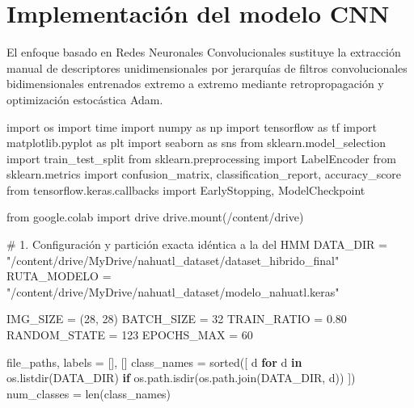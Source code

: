\documentclass[
  spanish,
  us-letterpaper,
]{scrreprt}
\newenvironment{Shaded}{\begin{snugshade}}{\end{snugshade}}
\newcommand{\BuiltInTok}[1]{\textcolor[rgb]{0.00,0.23,0.31}{#1}}
\newcommand{\CommentTok}[1]{\textcolor[rgb]{0.37,0.37,0.37}{#1}}
\newcommand{\ControlFlowTok}[1]{\textcolor[rgb]{0.00,0.23,0.31}{\textbf{#1}}}
\newcommand{\DecValTok}[1]{\textcolor[rgb]{0.68,0.00,0.00}{#1}}
\newcommand{\FloatTok}[1]{\textcolor[rgb]{0.68,0.00,0.00}{#1}}
\newcommand{\ImportTok}[1]{\textcolor[rgb]{0.00,0.46,0.62}{#1}}
\newcommand{\KeywordTok}[1]{\textcolor[rgb]{0.00,0.23,0.31}{\textbf{#1}}}
\newcommand{\NormalTok}[1]{\textcolor[rgb]{0.00,0.23,0.31}{#1}}
\newcommand{\OperatorTok}[1]{\textcolor[rgb]{0.37,0.37,0.37}{#1}}
\newcommand{\StringTok}[1]{\textcolor[rgb]{0.13,0.47,0.30}{#1}}
\theoremstyle{definition}
\theoremstyle{remark}
\begin{document}
\section{Implementación del modelo
CNN}\label{implementaciuxf3n-del-modelo-cnn}

El enfoque basado en Redes Neuronales Convolucionales sustituye la
extracción manual de descriptores unidimensionales por jerarquías de
filtros convolucionales bidimensionales entrenados extremo a extremo
mediante retropropagación y optimización estocástica Adam.

\label{cnn-datos-aumentacion}
\begin{Shaded}
\begin{Highlighting}[]
\ImportTok{import}\NormalTok{ os}
\ImportTok{import}\NormalTok{ time}
\ImportTok{import}\NormalTok{ numpy }\ImportTok{as}\NormalTok{ np}
\ImportTok{import}\NormalTok{ tensorflow }\ImportTok{as}\NormalTok{ tf}
\ImportTok{import}\NormalTok{ matplotlib.pyplot }\ImportTok{as}\NormalTok{ plt}
\ImportTok{import}\NormalTok{ seaborn }\ImportTok{as}\NormalTok{ sns}
\ImportTok{from}\NormalTok{ sklearn.model\_selection }\ImportTok{import}\NormalTok{ train\_test\_split}
\ImportTok{from}\NormalTok{ sklearn.preprocessing }\ImportTok{import}\NormalTok{ LabelEncoder}
\ImportTok{from}\NormalTok{ sklearn.metrics }\ImportTok{import}\NormalTok{ confusion\_matrix, classification\_report, accuracy\_score}
\ImportTok{from}\NormalTok{ tensorflow.keras.callbacks }\ImportTok{import}\NormalTok{ EarlyStopping, ModelCheckpoint}

\ImportTok{from}\NormalTok{ google.colab }\ImportTok{import}\NormalTok{ drive}
\NormalTok{drive.mount(}\StringTok{\textquotesingle{}/content/drive\textquotesingle{}}\NormalTok{)}

\CommentTok{\# 1. Configuración y partición exacta idéntica a la del HMM}
\NormalTok{DATA\_DIR }\OperatorTok{=} \StringTok{"/content/drive/MyDrive/nahuatl\_dataset/dataset\_hibrido\_final"}
\NormalTok{RUTA\_MODELO }\OperatorTok{=} \StringTok{"/content/drive/MyDrive/nahuatl\_dataset/modelo\_nahuatl.keras"}

\NormalTok{IMG\_SIZE }\OperatorTok{=}\NormalTok{ (}\DecValTok{28}\NormalTok{, }\DecValTok{28}\NormalTok{)}
\NormalTok{BATCH\_SIZE }\OperatorTok{=} \DecValTok{32}
\NormalTok{TRAIN\_RATIO }\OperatorTok{=} \FloatTok{0.80}
\NormalTok{RANDOM\_STATE }\OperatorTok{=} \DecValTok{123}
\NormalTok{EPOCHS\_MAX }\OperatorTok{=} \DecValTok{60}

\NormalTok{file\_paths, labels }\OperatorTok{=}\NormalTok{ [], []}
\NormalTok{class\_names }\OperatorTok{=} \BuiltInTok{sorted}\NormalTok{([}
\NormalTok{    d }\ControlFlowTok{for}\NormalTok{ d }\KeywordTok{in}\NormalTok{ os.listdir(DATA\_DIR)}
    \ControlFlowTok{if}\NormalTok{ os.path.isdir(os.path.join(DATA\_DIR, d))}
\NormalTok{])}
\NormalTok{num\_classes }\OperatorTok{=} \BuiltInTok{len}\NormalTok{(class\_names)}


\end{Highlighting}
\end{Shaded}
\end{document}
